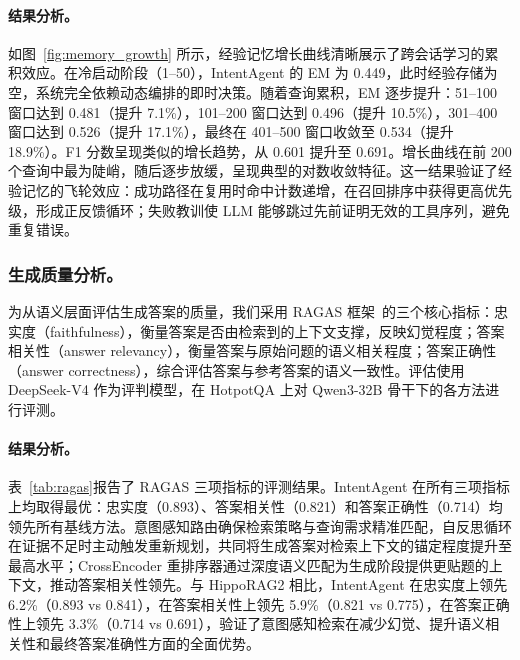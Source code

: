 \documentclass[runningheads]{llncs}
\begin{document}
\paragraph{结果分析。}

如图~\ref{fig:memory_growth} 所示，经验记忆增长曲线清晰展示了跨会话学习的累积效应。在冷启动阶段（1--50），IntentAgent 的 EM 为 0.449，此时经验存储为空，系统完全依赖动态编排的即时决策。随着查询累积，EM 逐步提升：51--100 窗口达到 0.481（提升 7.1\%），101--200 窗口达到 0.496（提升 10.5\%），301--400 窗口达到 0.526（提升 17.1\%），最终在 401--500 窗口收敛至 0.534（提升 18.9\%）。F1 分数呈现类似的增长趋势，从 0.601 提升至 0.691。增长曲线在前 200 个查询中最为陡峭，随后逐步放缓，呈现典型的对数收敛特征。这一结果验证了经验记忆的飞轮效应：成功路径在复用时命中计数递增，在召回排序中获得更高优先级，形成正反馈循环；失败教训使 LLM 能够跳过先前证明无效的工具序列，避免重复错误。

\subsubsection{生成质量分析。}

为从语义层面评估生成答案的质量，我们采用 RAGAS 框架~\cite{ref29}的三个核心指标：忠实度（faithfulness），衡量答案是否由检索到的上下文支撑，反映幻觉程度；答案相关性（answer relevancy），衡量答案与原始问题的语义相关程度；答案正确性（answer correctness），综合评估答案与参考答案的语义一致性。评估使用 DeepSeek-V4 作为评判模型，在 HotpotQA 上对 Qwen3-32B 骨干下的各方法进行评测。

\paragraph{结果分析。}

表~\ref{tab:ragas}报告了 RAGAS 三项指标的评测结果。IntentAgent 在所有三项指标上均取得最优：忠实度（0.893）、答案相关性（0.821）和答案正确性（0.714）均领先所有基线方法。意图感知路由确保检索策略与查询需求精准匹配，自反思循环在证据不足时主动触发重新规划，共同将生成答案对检索上下文的锚定程度提升至最高水平；CrossEncoder 重排序器通过深度语义匹配为生成阶段提供更贴题的上下文，推动答案相关性领先。与 HippoRAG2 相比，IntentAgent 在忠实度上领先 6.2\%（0.893 vs 0.841），在答案相关性上领先 5.9\%（0.821 vs 0.775），在答案正确性上领先 3.3\%（0.714 vs 0.691），验证了意图感知检索在减少幻觉、提升语义相关性和最终答案准确性方面的全面优势。
\end{document}
